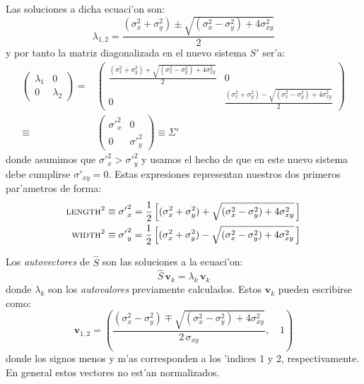 Las soluciones a dicha ecuaci'on son:
%
\begin{equation}
  \label{eq:eigensol}
  \lambda_{1,2} = \frac{(\sigma_x^2+\sigma_y^2) \pm 
    \sqrt{(\sigma_x^2-\sigma_y^2) + 4\sigma_{xy}^2}}{2}
\end{equation}
%
y por tanto la matriz diagonalizada en el nuevo sistema $S'$ ser'a:
%
\begin{equation}
  \begin{split}
    \label{eq:Snew}
    \begin{pmatrix}
      \lambda_1 & 0\\0 & \lambda_2
    \end{pmatrix}
    = &
    \begin{pmatrix}
      \displaystyle \frac{(\sigma_x^2+\sigma_y^2) +
        \sqrt{(\sigma_x^2-\sigma_y^2) + 4\sigma_{xy}^2}}{2} & 0 \\
      0 & \displaystyle \frac{(\sigma_x^2+\sigma_y^2) - 
        \sqrt{(\sigma_x^2-\sigma_y^2) + 4\sigma_{xy}^2}}{2}
    \end{pmatrix}\\
    \equiv &
    \begin{pmatrix}
      {\sigma'}_x^2 & 0\\0 & {\sigma'}_y^2
    \end{pmatrix}
    \equiv \Sigma'
  \end{split}
\end{equation}
%
donde asumimos que ${\sigma'}_x^2 > {\sigma'}_y^2$ y usamos el hecho
de que en este nuevo sistema debe cumplirse ${\sigma'}_{xy}=0$. Estas
expresiones representan nuestros dos primeros par'ametros de forma:
%
\begin{align}
  \label{eq:lengthwidth}
  \text{\scshape length}^2 &\equiv {\sigma'}_x^2 = 
  \frac{1}{2}\left[(\sigma_x^2+\sigma_y^2) +
    \sqrt{(\sigma_x^2-\sigma_y^2) + 4\sigma_{xy}^2}\,\right] \\
  \text{\scshape width}^2 &\equiv {\sigma'}_y^2 = 
  \frac{1}{2}\left[(\sigma_x^2+\sigma_y^2) -
    \sqrt{(\sigma_x^2-\sigma_y^2) + 4\sigma_{xy}^2}\,\right]
\end{align}

Los \emph{autovectores} de $\hat{S}$ son las soluciones a la
ecuaci'on:
%
\begin{equation}
  \label{eq:eigenveceq}
  \hat{S}\,\mathbf{v}_k = \lambda_k\,\mathbf{v}_k
\end{equation}
%
donde $\lambda_k$ son los \emph{autovalores} previamente
calculados. Estos $\mathbf{v}_k$ pueden escribirse como:
%
\begin{equation}
  \label{eq:eigenvec}
  \mathbf{v}_{1,2} = \left(
    \frac{(\sigma_x^2-\sigma_y^2) \mp
      \sqrt{(\sigma_x^2-\sigma_y^2) + 4\sigma_{xy}^2}}{2\,\sigma_{xy}},
    \quad 1 \right)
\end{equation}
%
donde los signos menos y m'as corresponden a los 'indices 1 y 2,
respectivamente. En general estos vectores no est'an normalizados.

